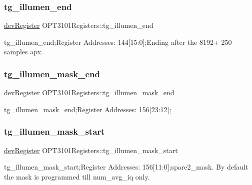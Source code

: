 \subsubsection{\texorpdfstring{tg\+\_\+illumen\+\_\+end}{tg\_illumen\_end}}
{\footnotesize\ttfamily \mbox{\hyperlink{classdev_register}{dev\+Register}} O\+P\+T3101\+Registers\+::tg\+\_\+illumen\+\_\+end}



tg\+\_\+illumen\+\_\+end;Register Addresses\+: 144\mbox{[}15\+:0\mbox{]};Ending after the 8192+ 250 samples apx. 

\mbox{\label{class_o_p_t3101_registers_a43f4677b0d1e0ba15da82b7d896d8349}} 
\subsubsection{\texorpdfstring{tg\+\_\+illumen\+\_\+mask\+\_\+end}{tg\_illumen\_mask\_end}}
{\footnotesize\ttfamily \mbox{\hyperlink{classdev_register}{dev\+Register}} O\+P\+T3101\+Registers\+::tg\+\_\+illumen\+\_\+mask\+\_\+end}



tg\+\_\+illumen\+\_\+mask\+\_\+end;Register Addresses\+: 156\mbox{[}23\+:12\mbox{]}; 

\mbox{\label{class_o_p_t3101_registers_a293592cb7a4cefc2b9db6e40b8d75bbc}} 
\subsubsection{\texorpdfstring{tg\+\_\+illumen\+\_\+mask\+\_\+start}{tg\_illumen\_mask\_start}}
{\footnotesize\ttfamily \mbox{\hyperlink{classdev_register}{dev\+Register}} O\+P\+T3101\+Registers\+::tg\+\_\+illumen\+\_\+mask\+\_\+start}



tg\+\_\+illumen\+\_\+mask\+\_\+start;Register Addresses\+: 156\mbox{[}11\+:0\mbox{]};spare2\+\_\+mask. By default the mask is programmed till num\+\_\+avg\+\_\+iq only. 

